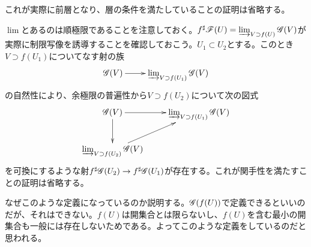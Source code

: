 \begin{rem}
これが実際に前層となり、層の条件を満たしていることの証明は省略する。
\end{rem}


\begin{rem}
$\lim$とあるのは順極限であることを注意しておく。$f^{\sharp}\mathscr{F} (U) =  \operatorname*{\varinjlim}_{V \supset f(U)} \mathscr{G}(V)$が実際に制限写像を誘導することを確認しておこう。$U_1 \subset U_2$とする。このとき$V \supset f(U_1)$についてなす射の族
\[
\xymatrix{
\scrg(V) \ar[r] & \rlim_{V \supset f(U_1)} \scrg(V)
}
\]
の自然性により、余極限の普遍性から$V \supset f(U_2)$について次の図式
\[
\xymatrix{
\scrg(V) \ar[r] \ar[d] & \rlim_{V \supset f(U_1)} \scrg(V) \\
\rlim_{V \supset f(U_2)} \scrg(V) \ar[ru] & {}
}
\]
を可換にするような射$f^{\sharp} \mathscr{G}(U_2) \to  f^{\sharp}\mathscr{G}(U_1)$が存在する。これが関手性を満たすことの証明は省略する。

なぜこのような定義になっているのか説明する。$\mathscr{G}(f(U))$で定義できるといいのだが、それはできない。$f(U)$は開集合とは限らないし、$f(U)$を含む最小の開集合も一般には存在しないためである。よってこのような定義をしているのだと思われる。
\end{rem}






